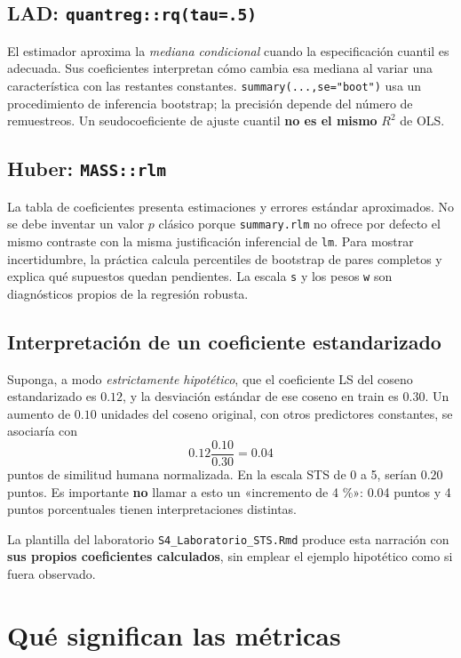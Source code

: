 \documentclass[11pt,a4paper]{article}
\begin{document}
\subsection{LAD: \texttt{quantreg::rq(tau=.5)}}

El estimador aproxima la \emph{mediana condicional} cuando la especificación cuantil es adecuada. Sus coeficientes interpretan cómo cambia esa mediana al variar una característica con las restantes constantes. \texttt{summary(...,se="boot")} usa un procedimiento de inferencia bootstrap; la precisión depende del número de remuestreos. Un seudocoeficiente de ajuste cuantil \textbf{no es el mismo} \(R^2\) de OLS.

\subsection{Huber: \texttt{MASS::rlm}}

La tabla de coeficientes presenta estimaciones y errores estándar aproximados. No se debe inventar un valor \(p\) clásico porque \texttt{summary.rlm} no ofrece por defecto el mismo contraste con la misma justificación inferencial de \texttt{lm}. Para mostrar incertidumbre, la práctica calcula percentiles de bootstrap de pares completos y explica qué supuestos quedan pendientes. La escala \texttt{s} y los pesos \texttt{w} son diagnósticos propios de la regresión robusta.

\subsection{Interpretación de un coeficiente estandarizado}

Suponga, a modo \emph{estrictamente hipotético}, que el coeficiente LS del coseno estandarizado es \(0.12\), y la desviación estándar de ese coseno en train es \(0.30\). Un aumento de \(0.10\) unidades del coseno original, con otros predictores constantes, se asociaría con
\[
  0.12\frac{0.10}{0.30}=0.04
\]
puntos de similitud humana normalizada. En la escala STS de 0 a 5, serían \(0.20\) puntos. Es importante \textbf{no} llamar a esto un «incremento de 4 \%»: 0.04 puntos y 4 puntos porcentuales tienen interpretaciones distintas.

La plantilla del laboratorio \texttt{S4\_Laboratorio\_STS.Rmd} produce esta narración con \textbf{sus propios coeficientes calculados}, sin emplear el ejemplo hipotético como si fuera observado.

\section{Qué significan las métricas}
\end{document}

